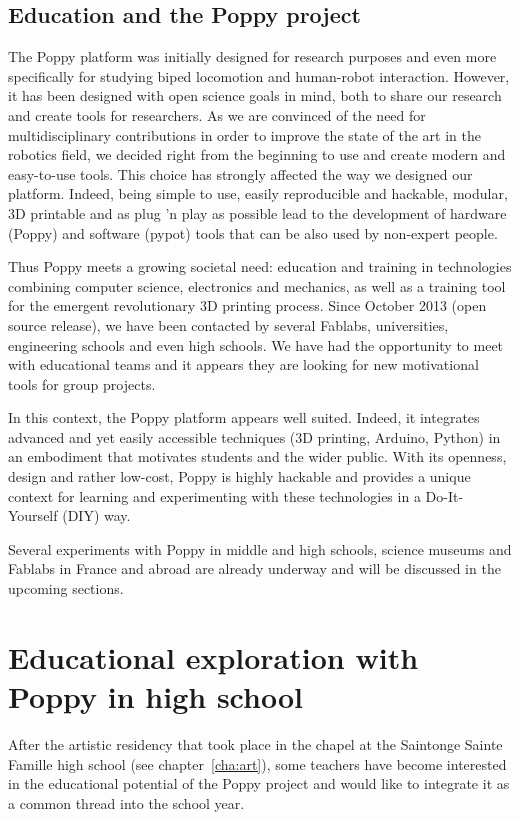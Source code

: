 \subsection{Education and the Poppy project} %

The Poppy platform was initially designed for research purposes and even more specifically for studying biped locomotion and human-robot interaction. However, it has been designed with open science goals in mind, both to share our research and create tools for researchers. As we are convinced of the need for multidisciplinary contributions in order to improve the state of the art in the robotics field, we decided right from the beginning to use and create modern and easy-to-use tools. This choice has strongly affected the way we designed our platform. Indeed, being simple to use, easily reproducible and hackable, modular, 3D printable and as plug 'n play as possible lead to the development of hardware (Poppy) and software (pypot) tools that can be also used by non-expert people.

Thus Poppy meets a growing societal need: education and training in technologies combining computer science, electronics and mechanics, as well as a training tool for the emergent revolutionary 3D printing process. Since October 2013 (open source release), we have been contacted by several Fablabs, universities, engineering schools and even high schools. We have had the opportunity to meet with educational teams and it appears they are looking for new motivational tools for group projects.

In this context, the Poppy platform appears well suited. Indeed, it integrates advanced and yet easily accessible techniques (3D printing, Arduino, Python) in an embodiment that motivates students and the wider public. With its openness, design and rather low-cost, Poppy is highly hackable and provides a unique context for learning and experimenting with these technologies in a Do-It-Yourself (DIY) way.

Several experiments with Poppy in middle and high schools, science museums and Fablabs in France and abroad are already underway and will be discussed in the upcoming sections.


\section{Educational exploration with Poppy in high school} %

After the artistic residency that took place in the chapel at the Saintonge Sainte Famille high school (see chapter~\ref{cha:art}), some teachers have become interested in the educational potential of the Poppy project and would like to integrate it as a common thread into the school year.

